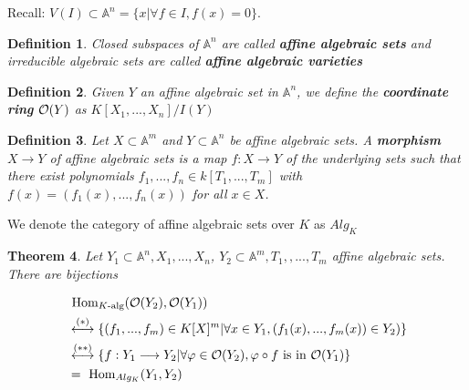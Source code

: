 \documentclass[11pt]{article}
\newtheorem{thm}{Theorem}[section]
\newtheorem{dfn}[thm]{Definition}
\renewcommand{\hom}{\text{ Hom}}
\newcommand{\affn}{\mathbb A}
\newcommand{\calo}{{\cal O}}
\newcommand{\lrta}{\longrightarrow}
\newcommand{\llrta}{\longleftrightarrow}
\begin{document}
Recall: $V(I)\subset \affn^n =\{x|\forall f\in I, f(x)=0\}$.
\begin{dfn}
Closed subspaces of $\affn^n$ are called \textbf{affine algebraic sets} and irreducible algebraic sets are called \textbf{affine algebraic varieties}
\end{dfn}
\begin{dfn}
Given $Y$ an affine algebraic set in $\affn^n$, we define the \textbf{coordinate ring} $\calo(Y)$ as $K[X_1,...,X_n]/I(Y)$
\end{dfn}
\begin{dfn}
Let $X\subset \affn^m$ and $Y \subset \affn^n$ be affine algebraic sets. A \textbf{morphism} $X \lrta Y$ of affine algebraic sets is a map $f : X \lrta Y$ of the underlying sets such that there exist polynomials $f_1,...,f_n \in k[T_1,...,T_m]$ with $f(x) = (f_1(x),...,f_n(x))$ for all $x\in X$. 
\end{dfn}
We denote the category of affine algebraic sets over $K$ as $Alg_K$
\begin{thm}\label{thm:equivalence_of_categories_algebraic_sets_K_algebras}
Let $Y_1\subset \affn^n, X_1,...,X_n$, $Y_2\subset \affn^m, T_1,,..., T_m$ affine algebraic sets. There are bijections 

$$
\begin{aligned}
&\hom_{K\text{-alg}}(\calo(Y_2),\calo(Y_1))
\\
&\overset{(*)}{\llrta}\{(f_1,...,f_m)\in K[X]^m|\forall x\in Y_1,(f_1(x),...,f_m(x))\in Y_2) \}\\
&\overset{(**)}{\llrta} \{f:Y_1\lrta Y_2|\forall \varphi\in \calo(Y_2),\varphi\circ f\text{ is  in }  \calo(Y_1)\}\\
&=\hom_{Alg_K}(Y_1,Y_2)
\end{aligned}
$$
\end{thm}
\end{document}
